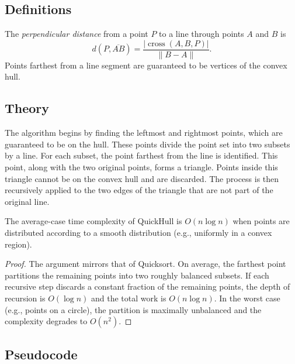 \subsection{Definitions}

\begin{definition}\label{def:dist_from_line}
The \emph{perpendicular distance} from a point $P$ to a line through points $A$ and $B$ is
\[
d(P, \overline{AB}) = \frac{|\operatorname{cross}(A, B, P)|}{\|B - A\|}.
\]
Points farthest from a line segment are guaranteed to be vertices of the convex hull.
\end{definition}

\subsection{Theory}

The algorithm begins by finding the leftmost and rightmost points, which are guaranteed to be on the hull. These points divide the point set into two subsets by a line. For each subset, the point farthest from the line is identified. This point, along with the two original points, forms a triangle. Points inside this triangle cannot be on the convex hull and are discarded. The process is then recursively applied to the two edges of the triangle that are not part of the original line.

\begin{theorem}\label{thm:quickhull_avg}
The average-case time complexity of QuickHull is $O(n \log n)$ when points are distributed according to a smooth distribution (e.g., uniformly in a convex region).
\end{theorem}
\begin{proof}
The argument mirrors that of Quicksort. On average, the farthest point partitions the remaining points into two roughly balanced subsets. If each recursive step discards a constant fraction of the remaining points, the depth of recursion is $O(\log n)$ and the total work is $O(n \log n)$. In the worst case (e.g., points on a circle), the partition is maximally unbalanced and the complexity degrades to $O(n^2)$.
\end{proof}

\subsection{Pseudocode}

